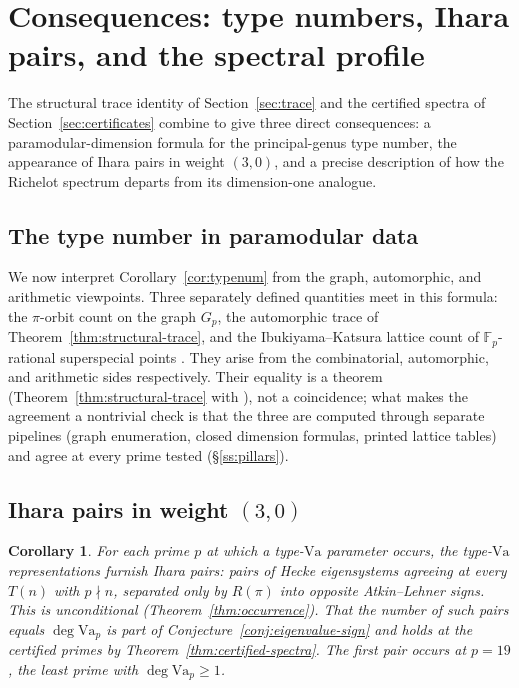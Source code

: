 \documentclass[10pt,a4paper]{amsart}
\newtheorem{corollary}[theorem]{Corollary}
\newcommand{\F}{\mathbb{F}}
\newcommand{\Va}{\mathrm{Va}}
\providecommand{\Va}{\mathrm{Va}}
\begin{document}
	\section{Consequences: type numbers, Ihara pairs, and the spectral profile}
	\label{sec:consequences}
	
	The structural trace identity of Section~\ref{sec:trace} and the certified
	spectra of Section~\ref{sec:certificates} combine to give three direct
	consequences: a paramodular-dimension formula for the principal-genus type
	number, the appearance of Ihara pairs in weight $(3,0)$, and a precise
	description of how the Richelot spectrum departs from its dimension-one
	analogue.
	
	\subsection{The type number in paramodular data}
	\label{ss:typenum-consequence}
	
	We now interpret Corollary~\ref{cor:typenum} from the graph,
	automorphic, and arithmetic viewpoints. Three separately defined quantities meet in this formula: the $\pi$-orbit count on the graph $G_p$, the automorphic trace of
	Theorem~\ref{thm:structural-trace}, and the Ibukiyama--Katsura lattice count of
	$\F_p$-rational superspecial points \cite[Thm.~2, Rem.~3]{IbukiyamaKatsura}. They arise from the combinatorial, automorphic, and arithmetic sides respectively. Their equality is a
	theorem (Theorem~\ref{thm:structural-trace} with \cite[Thm.~2]{IbukiyamaKatsura}), not a coincidence; what makes the agreement a nontrivial check is that the three are computed through separate pipelines (graph enumeration, closed dimension formulas, printed
	lattice tables) and agree at every prime tested (\S\ref{ss:pillars}).
	
	\subsection{Ihara pairs in weight $(3,0)$}
	\label{ss:ihara-consequence}
	
	\begin{corollary}	For each prime $p$ at which a type-$\Va$ parameter occurs, the
		type-$\Va$ representations furnish Ihara pairs: pairs of Hecke
		eigensystems agreeing at every $T(n)$ with $p\nmid n$, separated only
		by $R(\pi)$ into opposite Atkin--Lehner signs. This is unconditional
		(Theorem~\ref{thm:occurrence}). That the number of such pairs equals
		$\deg\Va_p$ is part of Conjecture~\ref{conj:eigenvalue-sign} and
		holds at the certified primes by Theorem~\ref{thm:certified-spectra}.
		The first pair occurs at $p=19$, the least prime with
		$\deg\Va_p\ge1$.
	\end{corollary}
	
\end{document}
